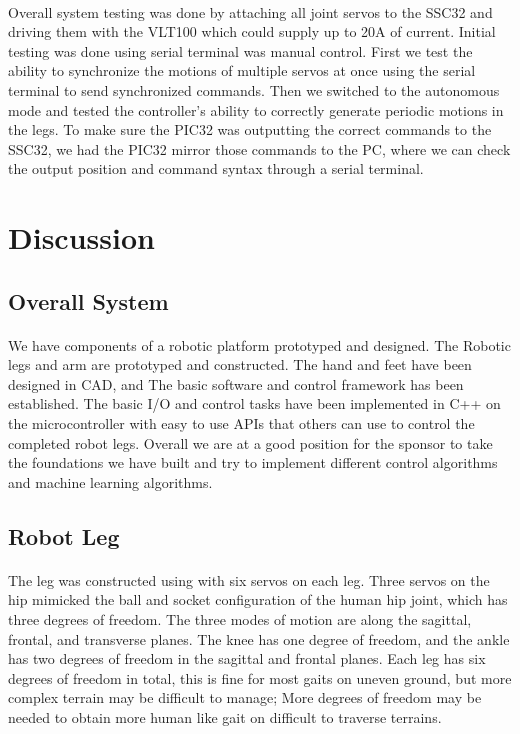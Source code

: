 \documentclass[titlepage,letterpaper,12pt]{article}
\begin{document}
\paragraph{} Overall system testing was done by attaching all joint servos to
the SSC32 and driving them with the VLT100 which could supply up to 20A of
current. Initial testing was done using serial terminal was manual control.
First we test the ability to synchronize the motions of multiple servos at once
using the serial terminal to send synchronized commands. Then we switched to the
autonomous mode and tested the controller's ability to correctly generate
periodic motions in the legs. To make sure the PIC32 was outputting the correct
commands to the SSC32, we had the PIC32 mirror those commands to the PC, where
we can check the output position and command syntax through a serial terminal.

\section{Discussion}
\subsection{Overall System}
\paragraph{}We have components of a robotic platform prototyped and
designed. The Robotic legs and arm are prototyped and constructed. The hand and
feet have been designed in CAD, and The basic software and control framework has
been established. The basic I/O and control tasks have been implemented in C++
on the microcontroller with easy to use APIs that others can use to control the
completed robot legs. Overall we are at a good position for the
sponsor to take the foundations we have built and try to implement different
control algorithms and machine learning algorithms.

\subsection{Robot Leg}
\paragraph{}The leg was constructed using with six servos on each leg. Three
servos on the hip mimicked the ball and socket configuration of the human hip
joint, which has three degrees of freedom\cite{SiasJr1990}. The three modes of
motion are along the sagittal, frontal, and transverse planes\cite{Fiscell2005}.
The knee has one degree of freedom, and the ankle has two degrees of freedom in
the sagittal and frontal planes. Each leg has six degrees of freedom in total,
this is fine for most gaits on uneven ground, but more complex terrain may be
difficult to manage; More degrees of freedom may be needed to obtain more human
like gait on difficult to traverse terrains\cite{SiasJr1990}.
\end{document}
